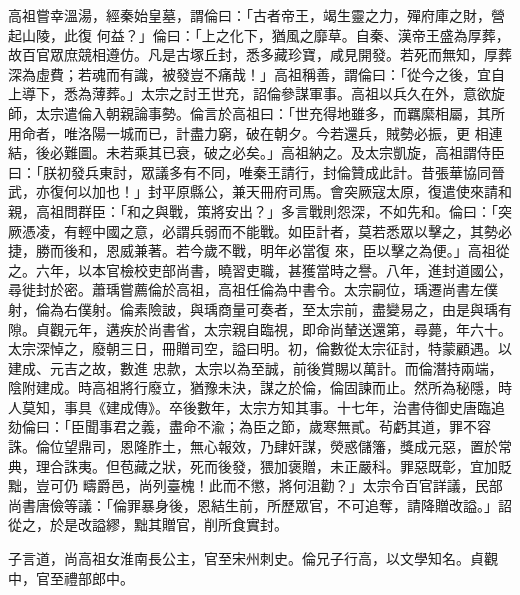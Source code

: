 \begin{pinyinscope}
 高祖嘗幸溫湯，經秦始皇墓，謂倫曰：「古者帝王，竭生靈之力，殫府庫之財，營起山陵，此復
 何益？」倫曰：「上之化下，猶風之靡草。自秦、漢帝王盛為厚葬，故百官眾庶競相遵仿。凡是古塚丘封，悉多藏珍寶，咸見開發。若死而無知，厚葬深為虛費；若魂而有識，被發豈不痛哉！」高祖稱善，謂倫曰：「從今之後，宜自上導下，悉為薄葬。」太宗之討王世充，詔倫參謀軍事。高祖以兵久在外，意欲旋師，太宗遣倫入朝親論事勢。倫言於高祖曰：「世充得地雖多，而羈縻相屬，其所用命者，唯洛陽一城而已，計盡力窮，破在朝夕。今若還兵，賊勢必振，更
 相連結，後必難圖。未若乘其已衰，破之必矣。」高祖納之。及太宗凱旋，高祖謂侍臣曰：「朕初發兵東討，眾議多有不同，唯秦王請行，封倫贊成此計。昔張華協同晉武，亦復何以加也！」封平原縣公，兼天冊府司馬。會突厥寇太原，復遣使來請和親，高祖問群臣：「和之與戰，策將安出？」多言戰則怨深，不如先和。倫曰：「突厥憑凌，有輕中國之意，必謂兵弱而不能戰。如臣計者，莫若悉眾以擊之，其勢必捷，勝而後和，恩威兼著。若今歲不戰，明年必當復
 來，臣以擊之為便。」高祖從之。六年，以本官檢校吏部尚書，曉習吏職，甚獲當時之譽。八年，進封道國公，尋徙封於密。蕭瑀嘗薦倫於高祖，高祖任倫為中書令。太宗嗣位，瑀遷尚書左僕射，倫為右僕射。倫素險詖，與瑀商量可奏者，至太宗前，盡變易之，由是與瑀有隙。貞觀元年，遘疾於尚書省，太宗親自臨視，即命尚輦送還第，尋薨，年六十。太宗深悼之，廢朝三日，冊贈司空，謚曰明。初，倫數從太宗征討，特蒙顧遇。以建成、元吉之故，數進
 忠款，太宗以為至誠，前後賞賜以萬計。而倫潛持兩端，陰附建成。時高祖將行廢立，猶豫未決，謀之於倫，倫固諫而止。然所為秘隱，時人莫知，事具《建成傳》。卒後數年，太宗方知其事。十七年，治書侍御史唐臨追劾倫曰：「臣聞事君之義，盡命不渝；為臣之節，歲寒無貳。茍虧其道，罪不容誅。倫位望鼎司，恩隆胙土，無心報效，乃肆奸謀，熒惑儲籓，獎成元惡，置於常典，理合誅夷。但苞藏之狀，死而後發，猥加褒贈，未正嚴科。罪惡既彰，宜加貶黜，豈可仍
 疇爵邑，尚列臺槐！此而不懲，將何沮勸？」太宗令百官詳議，民部尚書唐儉等議：「倫罪暴身後，恩結生前，所歷眾官，不可追奪，請降贈改謚。」詔從之，於是改謚繆，黜其贈官，削所食實封。



 子言道，尚高祖女淮南長公主，官至宋州刺史。倫兄子行高，以文學知名。貞觀中，官至禮部郎中。




\end{pinyinscope}
